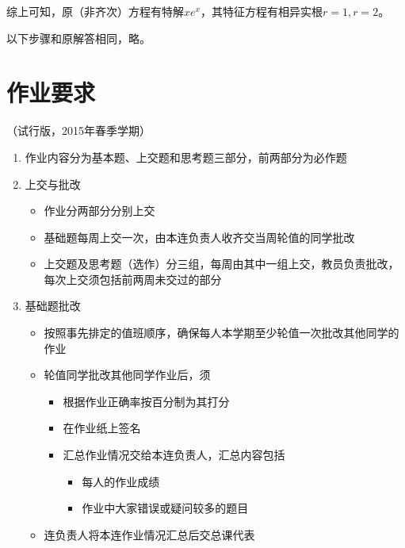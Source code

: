 	综上可知，原（非齐次）方程有特解$xe^x$，其特征方程有相异实根$r=1,r=2$。
	
	以下步骤和原解答相同，略。
	
	\newpage
	
	\section*{作业要求}
	
	\begin{center}
		（试行版，2015年春季学期）
	\end{center}
	
	\begin{enumerate}
	  \item 作业内容分为基本题、上交题和思考题三部分，前两部分为必作题
	  \item 上交与批改
	  \begin{itemize}
	    \item 作业分两部分分别上交
	    \item 基础题每周上交一次，由本连负责人收齐交当周轮值的同学批改
	    \item 上交题及思考题（选作）分三组，每周由其中一组上交，教员负责批改，
	    每次上交须包括前两周未交过的部分
	  \end{itemize}
	  \item 基础题批改
	  \begin{itemize}
	    \item 按照事先排定的值班顺序，确保每人本学期至少轮值一次批改其他同学的作业
	    \item 轮值同学批改其他同学作业后，须
	    \begin{itemize}
	      \item 根据作业正确率按百分制为其打分
	      \item 在作业纸上签名
	      \item 汇总作业情况交给本连负责人，汇总内容包括
	      \begin{itemize}
	        \item 每人的作业成绩
	        \item 作业中大家错误或疑问较多的题目
	      \end{itemize}
	    \end{itemize}
	    \item 连负责人将本连作业情况汇总后交总课代表
	  \end{itemize}
	\end{enumerate}
	
	\newpage

\fi